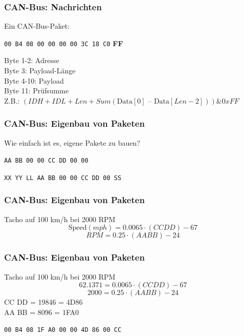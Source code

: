 \documentclass[t]{beamer}
\begin{document}
\begin{frame}
	\frametitle{CAN-Bus: Nachrichten}
    Ein CAN-Bus-Paket:
    \newline
    \newline
    \newline
    \newline
{\Large \centerline{\texttt{00 B4 08 00 00 00 00 3C 18 C0} \textbf{FF}}}
    \vspace*{1cm}

    Byte 1-2: Adresse \\
    Byte 3: Payload-Länge \\
    Byte 4-10: Payload \\
    Byte 11: Prüfsumme \\
    Z.B.: $(IDH + IDL + Len + Sum(\text{Data}[0]\text{ – }\text{Data}[Len-2])) \& 0xFF $
\end{frame}


\begin{frame}
	\frametitle{CAN-Bus: Eigenbau von Paketen}
    Wie einfach ist es, eigene Pakete zu bauen?
    \newline
    \newline
    \newline
    \newline
    {\Large \centerline{\texttt{AA BB 00 00 CC DD 00 00}}}
    \newline
    \newline
    {\Large \centerline{\texttt{XX YY LL AA BB 00 00 CC DD 00 SS}}}
\end{frame}

\begin{frame}
	\frametitle{CAN-Bus: Eigenbau von Paketen}
    Tacho auf 100 km/h bei 2000 RPM
    \newline
    \[\text{Speed} (mph) = 0.0065 \cdot (CC DD) - 67\]
    \[RPM = 0.25 \cdot (AA BB) - 24\]
\end{frame}

\begin{frame}
	\frametitle{CAN-Bus: Eigenbau von Paketen}
    Tacho auf 100 km/h bei 2000 RPM
    \newline
    \[62.1371 = 0.0065 \cdot (CC DD) - 67\]
    \[2000 = 0.25 \cdot (AA BB) - 24\]
    \newline
    CC DD = 19846 = 4D86 \\
    AA BB = 8096 = 1FA0
    \newline
    \newline
    {\Large \centerline{\texttt{00 B4 08 1F A0 00 00 4D 86 00 CC}}}

\end{frame}
\end{document}
